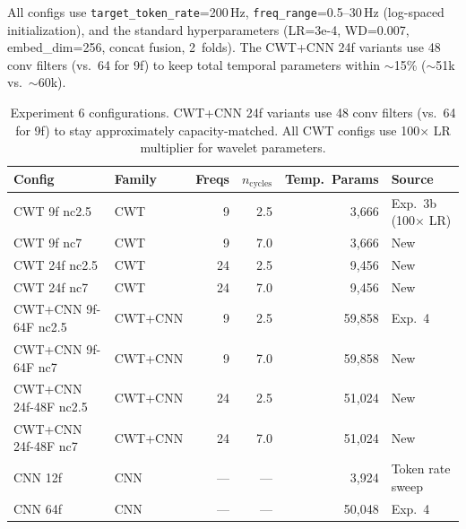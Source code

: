 \documentclass[11pt, a4paper]{article}
\begin{document}
All configs use \texttt{target\_token\_rate}=200\,Hz,
\texttt{freq\_range}=0.5--30\,Hz (log-spaced initialization), and the
standard hyperparameters (LR=3e-4, WD=0.007, embed\_dim=256, concat
fusion, 2~folds).  The CWT+CNN 24f variants use 48 conv filters
(vs.\ 64 for 9f) to keep total temporal parameters within $\sim$15\%
($\sim$51k vs.\ $\sim$60k).

\begin{table}[H]
      \centering
      \footnotesize
      \begin{tabular}{llrrrl}
            \toprule
            \textbf{Config}               & \textbf{Family} & \textbf{Freqs} & \textbf{$n_\text{cycles}$} & \textbf{Temp.\ Params} & \textbf{Source}            \\
            \midrule
            CWT 9f nc2.5                  & CWT             & 9              & 2.5                        & 3{,}666                & Exp.~3b (100$\times$ LR)  \\
            CWT 9f nc7                    & CWT             & 9              & 7.0                        & 3{,}666                & New                        \\
            CWT 24f nc2.5                 & CWT             & 24             & 2.5                        & 9{,}456                & New                        \\
            CWT 24f nc7                   & CWT             & 24             & 7.0                        & 9{,}456                & New                        \\
            \midrule
            CWT+CNN 9f-64F nc2.5          & CWT+CNN         & 9              & 2.5                        & 59{,}858               & Exp.~4                     \\
            CWT+CNN 9f-64F nc7            & CWT+CNN         & 9              & 7.0                        & 59{,}858               & New                        \\
            CWT+CNN 24f-48F nc2.5         & CWT+CNN         & 24             & 2.5                        & 51{,}024               & New                        \\
            CWT+CNN 24f-48F nc7           & CWT+CNN         & 24             & 7.0                        & 51{,}024               & New                        \\
            \midrule
            CNN 12f                       & CNN             & ---            & ---                        & 3{,}924                & Token rate sweep           \\
            CNN 64f                       & CNN             & ---            & ---                        & 50{,}048               & Exp.~4                     \\
            \bottomrule
      \end{tabular}
      \caption{Experiment 6 configurations.  CWT+CNN 24f variants use
            48 conv filters (vs.\ 64 for 9f) to stay approximately
            capacity-matched.  All CWT configs use 100$\times$ LR
            multiplier for wavelet parameters.}
      \label{tab:spectral-resolution-configs}
\end{table}
\end{document}
